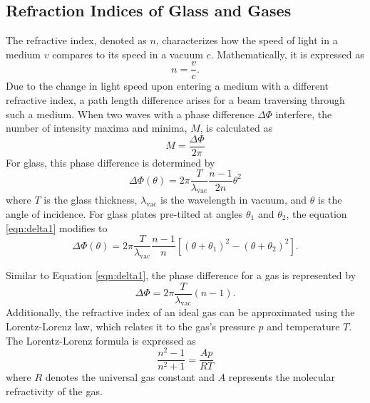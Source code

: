 \subsection{Refraction Indices of Glass and Gases}
The refractive index, denoted as $n$, characterizes how the speed of light in a medium $v$ 
compares to its speed in a vacuum $c$. Mathematically, it is expressed as
\begin{equation*}
    n=\frac{v}{c}.
\end{equation*}
Due to the change in light speed upon entering a medium with a different refractive index, 
a path length difference arises for a beam traversing through such a medium. 
When two waves with a phase difference $\Delta\Phi$ interfere, the number of intensity 
maxima and minima, $M$, is calculated as
\begin{equation}
    M=\frac{\Delta\Phi}{2\pi}
    \label{eqn:M}
\end{equation}
For glass, this phase difference is determined by
\begin{equation}
    \Delta\Phi(\theta)=2\pi\frac{T}{\lambda_\text{vac}}\frac{n-1}{2n}\theta^2
    \label{eqn:delta1}
\end{equation}
where $T$ is the glass thickness, $\lambda_\text{vac}$ is the wavelength in vacuum, and $\theta$ 
is the angle of incidence. For glass plates pre-tilted at angles $\theta_1$ and $\theta_2$, 
the equation \eqref{eqn:delta1} modifies to
\begin{equation}
    \Delta\Phi(\theta)=2\pi\frac{T}{\lambda_\text{vac}}\frac{n-1}{n}[(\theta+\theta_1)^2-(\theta+\theta_2)^2].
    \label{eqn:delta}
\end{equation}

Similar to Equation \eqref{eqn:delta1}, the phase difference for a gas is represented by
\begin{equation*}
    \Delta\Phi=2\pi\frac{T}{\lambda_\text{vac}}(n-1).
\end{equation*}
Additionally, the refractive index of an ideal gas can be approximated using the Lorentz-Lorenz law, 
which relates it to the gas's pressure $p$ and temperature $T$. The Lorentz-Lorenz formula is expressed as
\begin{equation}
    \frac{n^2-1}{n^2+1}=\frac{Ap}{RT}
    \label{eqn:LLL}
\end{equation}
where $R$ denotes the universal gas constant and $A$ represents the molecular refractivity of the gas.